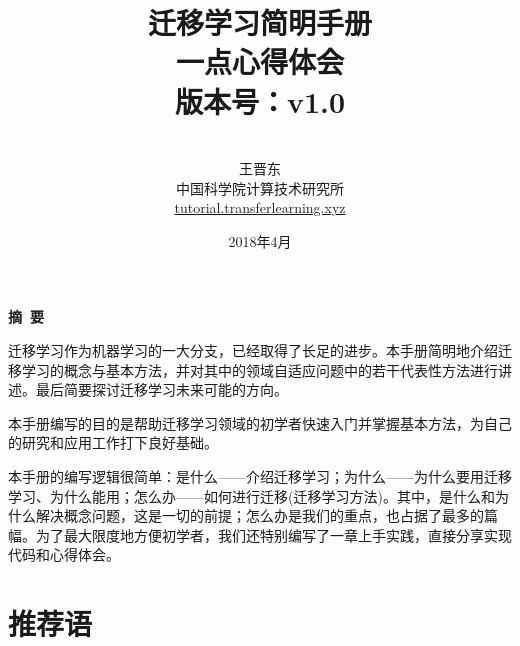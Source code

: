 \documentclass[a4paper]{article}
\begin{document}
\pagestyle{main}    %

\renewcommand{\refname}{参考文献} 
\renewcommand{\figurename}{图}
\renewcommand{\tablename}{表}
\renewcommand{\contentsname}{目录}
\renewcommand{\today}{\number\year 年 \number\month 月 \number\day 日}


\title{{\Huge 迁移学习简明手册{\large\linebreak\\}}{\Large 一点心得体会\\版本号：v1.0\linebreak\linebreak
}}
\author{\\
  王晋东\\中国科学院计算技术研究所\\\href{http://tutorial.transferlearning.xyz}{tutorial.transferlearning.xyz}}
\date{2018年4月}
\maketitle
\thispagestyle{empty}

\newpage

\thispagestyle{empty}
\begin{center}
{\Large\bf{摘\ 要\\}}
\end{center}

迁移学习作为机器学习的一大分支，已经取得了长足的进步。本手册简明地介绍迁移学习的概念与基本方法，并对其中的领域自适应问题中的若干代表性方法进行讲述。最后简要探讨迁移学习未来可能的方向。

本手册编写的目的是帮助迁移学习领域的初学者快速入门并掌握基本方法，为自己的研究和应用工作打下良好基础。

本手册的编写逻辑很简单：是什么——介绍迁移学习；为什么——为什么要用迁移学习、为什么能用；怎么办——如何进行迁移(迁移学习方法)。其中，是什么和为什么解决概念问题，这是一切的前提；怎么办是我们的重点，也占据了最多的篇幅。为了最大限度地方便初学者，我们还特别编写了一章上手实践，直接分享实现代码和心得体会。
\newpage

\thispagestyle{empty}
\section*{推荐语}
\end{document}
